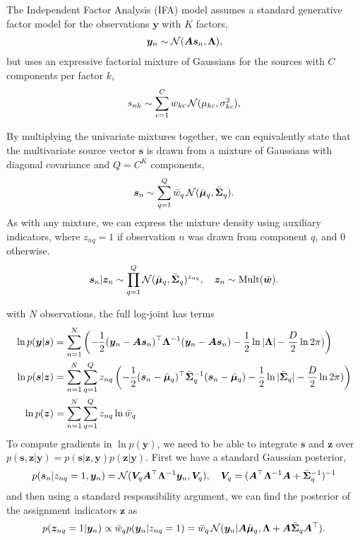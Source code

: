 \documentclass{article}
\newcommand{\mix}{\bm{A}}
\newcommand{\source}{s}
\newcommand{\sourcevec}{\bm{\source}}
\newcommand{\obs}{y}
\newcommand{\obsvec}{\bm{\obs}}
\newcommand{\mean}{\mu}
\newcommand{\meanvec}{\bm{\mean}}
\newcommand{\scale}{\sigma}
\newcommand{\scalesq}{\scale^2}
\newcommand{\weight}{w}
\newcommand{\compweight}{\bar{\weight}}
\newcommand{\compweightvec}{\bar{\bm{\weight}}}
\newcommand{\assign}{z}
\newcommand{\assignvec}{\bm{\assign}}
\newcommand{\compmeanvec}{\bar{\meanvec}}
\newcommand{\compcov}{\bar{\bm{\Sigma}}}
\newcommand{\noisecov}{\bm{\Lambda}}
\begin{document}
The Independent Factor Analysis (IFA) model assumes a standard generative factor model for the observations $\bm{y}$ with $K$ factors,  
\begin{align*}
\obsvec_n\sim \gaussrnd(\mix\sourcevec_n,\noisecov),
\end{align*}
but uses an expressive factorial mixture of Gaussians for the sources with $C$ components per factor $k$,
\begin{align*}
\source_{nk}\sim \sum_{c=1}^{C}\weight_{kc}\gaussrnd(\mean_{kc},\scalesq_{kc}),
\end{align*}

By multiplying the univariate mixtures together, we can equivalently state that the multivariate source vector $\sourcevec$ is drawn from a mixture of Gaussians with diagonal covariance and $Q=C^K$ components, 
\begin{equation}
\sourcevec_n\sim\sum_{q=1}^Q\compweight_{q}\gaussrnd(\compmeanvec_{q},\compcov_q).
\end{equation}
As with any mixture, we can express the mixture density using auxiliary indicators, where $\assign_{nq}=1$ if observation $n$ was drawn from component $q$, and $0$ otherwise.
\begin{equation}
\sourcevec_n\cond \assignvec_n\sim\prod_{q=1}^Q\gaussrnd(\compmeanvec_{q},\compcov_q)^{\assign_{nq}},\quad \assignvec_n\sim \multrnd(\compweightvec).
\end{equation}

with $N$ observations, the full log-joint has terms
\begin{align*}
\ln p(\obsvec|\sourcevec)&=\sum_{n=1}^{N}\left(-\frac{1}{2}(\obsvec_n-\mix\sourcevec_n)\T\noisecov^{-1}(\obsvec_n-\mix\sourcevec_n)-\frac{1}{2}\ln|\noisecov|-\frac{D}{2}\ln 2\pi)\right)\\
\ln p(\sourcevec|\assignvec)&=\sum_{n=1}^{N}\sum_{q=1}^{Q}\assign_{nq}\left(-\frac{1}{2}(\sourcevec_n-\compmeanvec_q)\T\compcov^{-1}_q(\sourcevec_n-\compmeanvec_q)-\frac{1}{2}\ln|\compcov_q|-\frac{D}{2}\ln 2\pi)\right)\\
\ln p(\assignvec)&=\sum_{n=1}^{N}\sum_{q=1}^{Q}\assign_{nq}\ln \compweight_{q}
\end{align*}
To compute gradients in $\ln p(\obsvec)$, we need to be able to integrate $\sourcevec$ and $\assignvec$ over $p(\sourcevec,\assignvec|\obsvec)=p(\sourcevec|\assignvec,\obsvec)p(\assignvec|\obsvec)$. First we have a standard Gaussian posterior,
\begin{equation}
p(\sourcevec_n|\assign_{nq}=1,\obsvec_n)=\gaussrnd(\bm{V}_q\mix\T\noisecov^{-1}\obsvec_n,\bm{V}_q),\quad \bm{V}_q=(\mix\T\noisecov^{-1}\mix+\compcov^{-1}_q)^{-1}
\end{equation}
and then using a standard responsibility argument, we can find the posterior of the assignment indicators $\assignvec$ as
\begin{equation}
p(\assignvec_{nq}=1|\obsvec_n)\propto \compweight_{q}p(\obsvec_n|\assign_{nq}=1)=\compweight_{q}\gaussrnd(\obsvec_n|\mix\compmeanvec_q,\noisecov+\mix\compcov_q\mix\T).
\end{equation}
\end{document}
